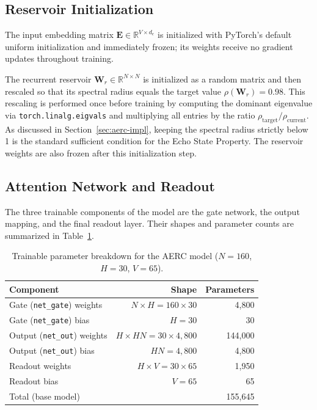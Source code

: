 \documentclass{sapthesis}
\begin{document}
\subsection{Reservoir Initialization}
The input embedding matrix $\mathbf{E} \in \mathbb{R}^{V \times d_e}$ is initialized with PyTorch's default uniform initialization and immediately frozen; its weights receive no gradient updates throughout training.

The recurrent reservoir $\mathbf{W}_r \in \mathbb{R}^{N \times N}$ is initialized as a random matrix and then rescaled so that its spectral radius equals the target value $\rho(\mathbf{W}_r) = 0.98$. This rescaling is performed once before training by computing the dominant eigenvalue via \texttt{torch.linalg.eigvals} and multiplying all entries by the ratio $\rho_{\text{target}} / \rho_{\text{current}}$. As discussed in Section~\ref{sec:aerc-impl}, keeping the spectral radius strictly below 1 is the standard sufficient condition for the Echo State Property. The reservoir weights are also frozen after this initialization step.

\subsection{Attention Network and Readout}
The three trainable components of the model are the gate network, the output mapping, and the final readout layer. Their shapes and parameter counts are summarized in Table~\ref{tab:param-count}.

\begin{table}[htbp]
  \centering
  \caption{Trainable parameter breakdown for the AERC model ($N=160$, $H=30$, $V=65$).}
  \label{tab:param-count}
  \begin{tabular}{lrr}
    \toprule
    Component                          & Shape                             & Parameters \\
    \midrule
    Gate (\texttt{net\_gate}) weights  & $N \times H = 160 \times 30$      & 4{,}800    \\
    Gate (\texttt{net\_gate}) bias     & $H = 30$                          & 30         \\
    Output (\texttt{net\_out}) weights & $H \times HN = 30 \times 4{,}800$ & 144{,}000  \\
    Output (\texttt{net\_out}) bias    & $HN = 4{,}800$                    & 4{,}800    \\
    Readout weights                    & $H \times V = 30 \times 65$       & 1{,}950    \\
    Readout bias                       & $V = 65$                          & 65         \\
    \midrule
    Total (base model)                 &                                   & 155{,}645  \\
    \bottomrule
  \end{tabular}
\end{table}
\end{document}
